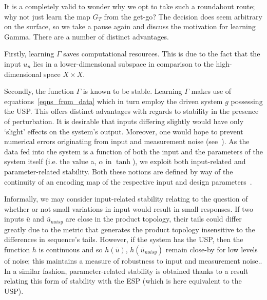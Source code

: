 It is a completely valid to wonder why we opt to take such a roundabout route; why not just learn the map $G_T$ from the get-go? The decision does seem arbitrary on the surface, so we take a pause again and discuss the motivation for learning Gamma.
There are a number of distinct advantages. 

Firstly, learning $\Gamma$ saves computational resources. This is due to the fact that the input $u_n$ lies in a lower-dimensional subspace in comparison to the high-dimensional space $X\times{X}$. 


Secondly, the function $\Gamma$ is known to be stable. Learning $\Gamma$ makes use of equations~\ref{eqns_from_data} which in turn employ the driven system $g$ possessing the USP. This offers distinct advantages with regards to stability in the presence of perturbation. 
It is desirable that inputs differing slightly would have only ‘slight’ effects on the system's output. Moreover, one would hope to prevent numerical errors originating from input and measurement noise (see~\cite[Theorem. 5]{manjunath2021universal}). 
As the data fed into the system is a function of both the input and the parameters of the system itself (i.e. the value a, $\alpha$ in $\tanh$), we exploit both input-related and parameter-related stability. 
Both these notions are defined by way of the continuity of an encoding map of the respective input and design parameters~\cite{manjunath2020stability}.

Informally, we may consider input-related stability relating to the question of whether or not small variations in input would result in small responses.   
If two inputs $\bar{u}$ and $\bar{u}_{noisy}$ are close in the product topology, their tails could differ greatly due to the metric that generates the product topology insensitive to the differences in sequence's tails.
 However, if the system has the USP, then the function $h$ is continuous and so $h(\bar{u})$, $h(\bar{u}_{noisy})$ remain close-by for low levels of noise; this maintains a measure of robustness to input and measurement noise.\cite{manjunath2021universal}.
In a similar fashion, parameter-related stability is obtained thanks to a result~\cite[Lemma 3.2]{manjunath2020stability} relating this form of stability with the ESP (which is here equivalent to the USP).

